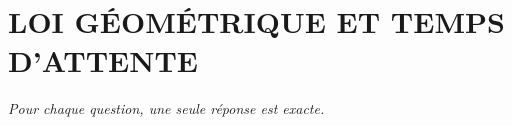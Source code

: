 
\section*{\textcolor{chapcolor}{\MakeUppercase{Loi géométrique et temps d'attente}}}

\begin{center}
\textit{Pour chaque question, une seule réponse est exacte.}
\end{center}


